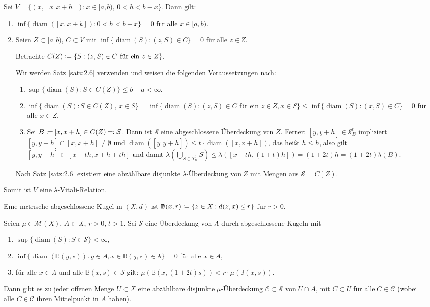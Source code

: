 \documentclass[a4paper,twoside,DIV15,BCOR12mm]{scrbook}
\DeclareMathOperator{\diam}{diam}
\begin{document}
\begin{beispiel}
Sei $V=\{(x,[x,x+h]): x\in [a,b),\, 0<h<b-x\}$. Dann gilt:
\begin{enumerate}
\item $\inf\{\diam([x,x+h]) : 0 < h < b-x\}=0$ für alle $x\in[a,b)$.
\item Seien $Z\subset [a,b)$, $C\subset V$ mit $\inf\{\diam(S): (z,S) \in C\}=0$ für alle $z\in Z$.

Betrachte $C(Z) \da \{S: (z,S)\in C\text{ für ein }z\in Z\}$.

Wir werden Satz \ref{satz:2.6} verwenden und weisen die folgenden Voraussetzungen nach:
\begin{enumerate}
\item $\sup\{\diam(S): S\in C(Z)\} \le b-a < \infty$.
\item $\inf\{\diam(S): S\in C(Z),\, x\in S\} = \inf\{\diam(S) : (z,S) \in C \text{ für ein $z\in Z$}, x\in S\} \le \inf\{\diam(S): (x,S)\in C\} = 0$ für alle $x\in Z$.
\item Sei $B \da [x,x+h] \in C(Z) \ad \mathcal S$. Dann ist $\mathcal S$ eine abgeschlossene Überdeckung von $Z$. Ferner: $[y,y+\bar h]\in\mathcal S_B^t$ impliziert $[y,y+\bar h] \cap [x,x+h] \ne \emptyset$ und $\diam([y,y+\bar h]) \le t\cdot \diam([x,x+h])$, das heißt $\bar h \le h$, also gilt $[y,y+\bar h] \subset [x-th,x+h+th]$ und damit $\lambda(\bigcup_{S\in\mathcal S_B^t}S) \le \lambda([x-th,(1+t)h]) = (1+2t)h = (1+2t)\lambda(B)$.
\end{enumerate}
Nach Satz \ref{satz:2.6} existiert eine abzählbare disjunkte $\lambda$-Überdeckung von $Z$ mit Mengen aus $\mathcal S = C(Z)$. 
\end{enumerate}
Somit ist $V$ eine $\lambda$-Vitali-Relation.
\end{beispiel}

\begin{definition}
Eine metrische abgeschlossene Kugel in $(X,d)$ ist $\mathbb B(x,r) \da  \{z\in X: d(z,x) \le r\}$ für $r>0$.
\end{definition}

\begin{korollar}
Seien $\mu \in \mathcal M(X)$, $A\subset X$, $r>0$, $t>1$. Sei $\mathcal S$ eine Überdeckung von $A$ durch abgeschlossene Kugeln mit
\begin{enumerate}
\item $\sup\{\diam(S): S\in\mathcal S\} <\infty$,
\item $\inf\{\diam(\mathbb B(y,s)): y\in A, x\in\mathbb B(y,s)\in \mathcal S\} = 0$ für alle $x\in A$,
\item für alle $x\in A$ und alle $\mathbb B(x,s)\in\mathcal S$ gilt: $\mu(\mathbb B(x,(1+2t)s)) < r \cdot \mu(\mathbb B(x,s))$.
\end{enumerate}
Dann gibt es zu jeder offenen Menge $U\subset X$ eine abzählbare disjunkte $\mu$-Überdeckung $\mathcal C\subset \mathcal S$ von $U\cap A$, mit $C\subset U$ für alle $C\in\mathcal C$ (wobei alle $C\in\mathcal C$ ihren Mittelpunkt in $A$ haben).
\end{korollar}
\end{document}

